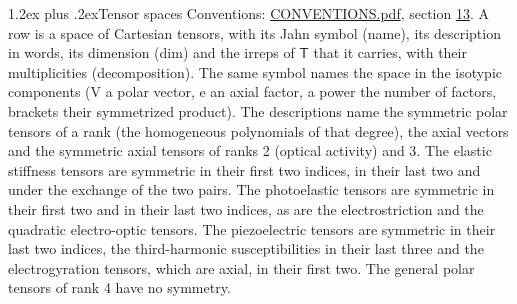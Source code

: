 \documentclass[10pt,a4paper]{article}
\makeatletter
\renewcommand\section{\@startsection{section}{1}{\z@}{-3ex plus -1ex minus -.2ex}%
  {1.2ex plus .2ex}{\normalfont\large\sffamily\bfseries\color{parttitle}}}
\numberwithin{equation}{section}
\newcommand{\grp}[1]{\mathsf{#1}}
\makeatother
\begin{document}
\section{Tensor spaces}\label{s:tensor_spaces}
Conventions: \href{../../CONVENTIONS.pdf}{CONVENTIONS.pdf}, section \href{../../CONVENTIONS.pdf\#conv.13}{13}.
\leavevmode\label{n:head.name}\label{n:head.description}\label{n:head.dim}\label{n:head.decomposition}A row is a space of Cartesian tensors, with its Jahn symbol (name), its description in words, its dimension (dim) and the irreps of $\grp{T}$ that it carries, with their multiplicities (decomposition). \label{n:label.jahn}The same symbol names the space in the isotypic components (V a polar vector, e an axial factor, a power the number of factors, brackets their symmetrized product). The descriptions name the symmetric polar tensors of a rank (the homogeneous polynomials of that degree), the axial vectors and the symmetric axial tensors of ranks 2 (optical activity) and 3. The elastic stiffness tensors are symmetric in their first two indices, in their last two and under the exchange of the two pairs. The photoelastic tensors are symmetric in their first two and in their last two indices, as are the electrostriction and the quadratic electro-optic tensors. The piezoelectric tensors are symmetric in their last two indices, the third-harmonic susceptibilities in their last three and the electrogyration tensors, which are axial, in their first two. The general polar tensors of rank 4 have no symmetry.
\end{document}
